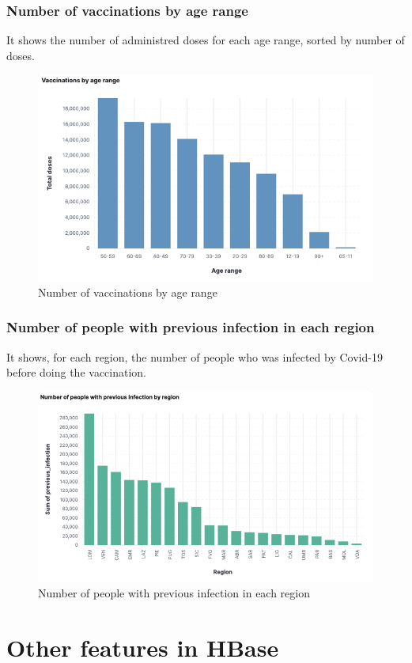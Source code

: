 \documentclass[12pt, a4paper]{article}
\begin{document}
\subsubsection{Number of vaccinations by age range}
It shows the number of administred doses for each age range, sorted by number of doses.
\begin{figure}[H]
  \centering
  \includegraphics[width=.85\linewidth]{img (15).png}
\caption*{Number of vaccinations by age range}
\end{figure}

\subsubsection{Number of people with previous infection in each region}
It shows, for each region, the number of people who was infected by Covid-19 before doing the vaccination.
\begin{figure}[H]
  \centering
  \includegraphics[width=.9\linewidth]{img (16).png}
\caption*{Number of people with previous infection in each region}
\end{figure}


\clearpage

\section{Other features in HBase} 
\end{document}
